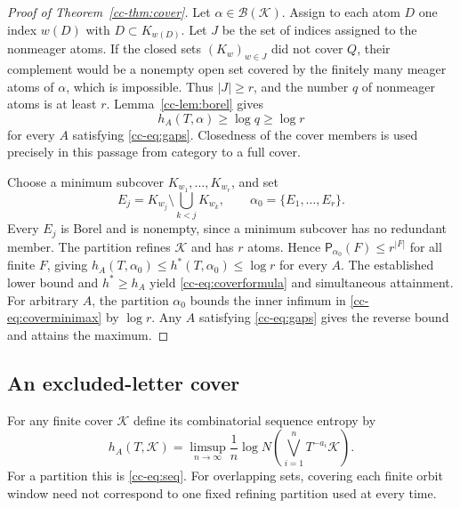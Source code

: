 \documentclass[11pt,reqno]{amsart}
\numberwithin{equation}{section}
\theoremstyle{definition}
\newcommand{\Patt}{\mathsf P}
\newcommand{\hpat}{h^{*}}
\newcommand{\K}{\mathcal K}
\begin{document}
\begin{proof}[Proof of Theorem~\ref{cc-thm:cover}]
Let $\alpha\in\mathcal B(\K)$. Assign to each atom $D$ one index
$w(D)$ with $D\subset K_{w(D)}$. Let $J$ be the set of indices assigned
to the nonmeager atoms. If the closed sets $(K_w)_{w\in J}$ did not
cover $Q$, their complement would be a nonempty open set covered by
the finitely many meager atoms of $\alpha$, which is impossible.
Thus $|J|\ge r$, and the number $q$ of nonmeager atoms is at least $r$.
Lemma~\ref{cc-lem:borel} gives
\[
 h_A(T,\alpha)\ge\log q\ge\log r
\]
for every $A$ satisfying \eqref{cc-eq:gaps}. Closedness of the cover
members is used precisely in this passage from category to a full cover.

Choose a minimum subcover $K_{w_1},\ldots,K_{w_r}$, and set
\begin{equation}\label{cc-eq:ordered}
 E_j=K_{w_j}\setminus\bigcup_{k<j}K_{w_k},\qquad
 \alpha_0=\{E_1,\ldots,E_r\}.
\end{equation}
Every $E_j$ is Borel and is nonempty, since a minimum subcover has no
redundant member. The partition refines $\K$ and has $r$ atoms. Hence
$\Patt_{\alpha_0}(F)\le r^{|F|}$ for all finite $F$, giving
$h_A(T,\alpha_0)\le\hpat(T,\alpha_0)\le\log r$ for every $A$.
The established lower bound and $\hpat\ge h_A$ yield
\eqref{cc-eq:coverformula} and simultaneous attainment.
For arbitrary $A$, the partition $\alpha_0$ bounds the inner infimum
in \eqref{cc-eq:coverminimax} by $\log r$. Any $A$ satisfying
\eqref{cc-eq:gaps} gives the reverse bound and attains the maximum.
\end{proof}


\subsection{An excluded-letter cover}

For any finite cover $\K$ define its combinatorial sequence entropy by
\[
 h_A(T,\K)=\limsup_{n\to\infty}\frac1n
 \log N\left(\bigvee_{i=1}^n T^{-a_i}\K\right).
\]
For a partition this is \eqref{cc-eq:seq}. For overlapping sets, covering
each finite orbit window need not correspond to one fixed refining
partition used at every time.
\end{document}
